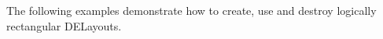 
The following examples demonstrate how to create, use and destroy logically rectangular DELayouts.
